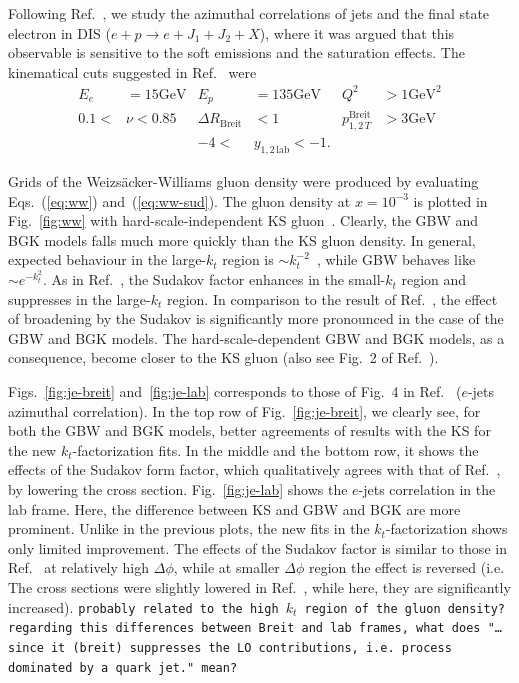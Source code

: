 \documentclass[a4,12pt]{article}
\newcommand{\GeV}[0]{\mathrm{GeV}}
\newcommand{\comment}[1]{\texttt{\color{red}#1}}
\begin{document}
Following Ref.~\cite{vanHameren:2021sqc}, we study the azimuthal correlations of jets and the final state electron in DIS ($e+p\rightarrow e+J_1+J_2+X$), where it was argued that this observable is sensitive to the soft emissions and the saturation effects. 
The kinematical cuts suggested in Ref.~\cite{vanHameren:2021sqc} were
\begin{align*}
	E_e&=15\GeV& E_p&=135\GeV& Q^2&>1\GeV^2\\
	0.1<&\nu<0.85&\Delta R_{\mathrm{Breit}}&<1&p^{\mathrm{Breit}}_{1,2\,T}&>3\GeV\\
	&&-4<&y_{1,2\,\mathrm{lab}}<-1.&&
\end{align*}

Grids of the Weizs\"acker-Williams gluon density were produced by evaluating Eqs.~(\ref{eq:ww}) and~(\ref{eq:ww-sud}).
The gluon density at $x=10^{-3}$ is plotted in Fig.~\ref{fig:ww} with hard-scale-independent KS gluon~\cite{vanHameren:2021sqc}. Clearly, the GBW and BGK models falls much more quickly than the KS gluon density. In general, expected behaviour in the large-$k_t$ region is $\sim k_t^{-2}$~\cite{Dominguez:2010xd,Dominguez:2011wm}, while GBW behaves like $\sim e^{-k_t^2}$.
As in Ref.~\cite{vanHameren:2021sqc}, the Sudakov factor enhances in the small-$k_t$ region and suppresses in the large-$k_t$ region. In comparison to the result of Ref.~\cite{vanHameren:2021sqc}, the effect of broadening by the Sudakov is significantly more pronounced in the case of the GBW and BGK models. The hard-scale-dependent GBW and BGK models, as a consequence, become closer to the KS gluon (also see Fig.~2 of Ref.~\cite{vanHameren:2021sqc}).  

Figs.~\ref{fig:je-breit} and~\ref{fig:je-lab} corresponds to those of Fig.~4 in Ref.~\cite{vanHameren:2021sqc} ($e$-jets azimuthal correlation). 
In the top row of Fig.~\ref{fig:je-breit}, we clearly see, for both the GBW and BGK models, better agreements of results with the KS for the new $k_t$-factorization fits. In the middle and the bottom row, it shows the effects of the Sudakov form factor, which qualitatively agrees with that of Ref.~\cite{vanHameren:2021sqc}, by lowering the cross section.
Fig.~\ref{fig:je-lab} shows the $e$-jets correlation in the lab frame. Here, the difference between KS and GBW and BGK are more prominent. Unlike in the previous plots, the new fits in the $k_t$-factorization shows only limited improvement.
The effects of the Sudakov factor is similar to those in Ref.~\cite{vanHameren:2021sqc} at relatively high $\Delta \phi$, while at smaller $\Delta \phi$ region the effect is reversed (i.e. The cross sections were slightly lowered in Ref.~\cite{vanHameren:2021sqc}, while here, they are significantly increased). \comment{probably related to the high $k_t$ region of the gluon density?}\\
\comment{regarding this differences between Breit and lab frames, what does "\dots since it (breit) suppresses the LO contributions, i.e. process dominated by a quark jet." mean?}
\end{document}
